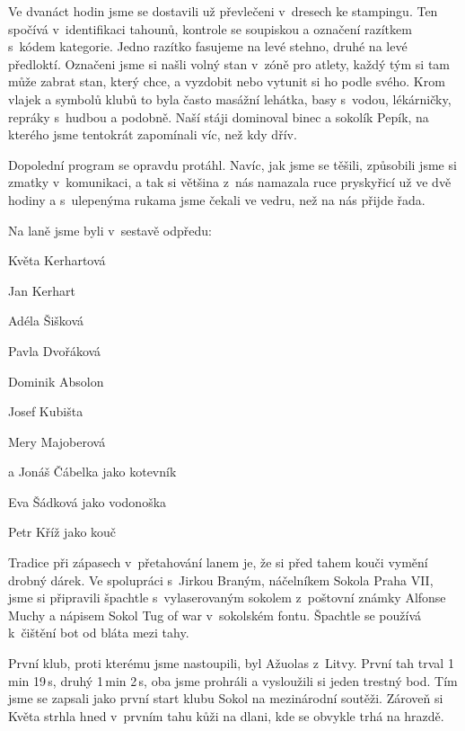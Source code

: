 \documentclass[11pt]{article}
\begin{document}
Ve dvanáct hodin jsme se dostavili už převlečeni v~dresech ke stampingu. Ten spočívá v~identifikaci tahounů, kontrole se soupiskou a označení razítkem s~kódem kategorie. Jedno razítko fasujeme na levé stehno, druhé na levé předloktí. Označeni jsme si našli volný stan v~zóně pro atlety, každý tým si tam může zabrat stan, který chce, a vyzdobit nebo vytunit si ho podle svého. Krom vlajek a symbolů klubů to byla často masážní lehátka, basy s~vodou, lékárničky, repráky s~hudbou a podobně. Naší stáji dominoval binec a sokolík Pepík, na kterého jsme tentokrát zapomínali víc, než kdy dřív.

Dopolední program se opravdu protáhl. Navíc, jak jsme se těšili, způsobili jsme si zmatky v~komunikaci, a tak si většina z~nás namazala ruce pryskyřicí už ve dvě hodiny a s~ulepenýma rukama jsme čekali ve vedru, než na nás přijde řada.

Na laně jsme byli v~sestavě odpředu:

\vspace*{6pt}

Květa Kerhartová

Jan Kerhart

Adéla Šišková

Pavla Dvořáková

Dominik Absolon

Josef Kubišta

Mery Majoberová

a Jonáš Čábelka jako kotevník

\vspace*{6pt}

Eva Šádková jako vodonoška

Petr Kříž jako kouč

\vspace*{6pt}

Tradice při zápasech v~přetahování lanem je, že si před tahem kouči vymění drobný dárek. Ve spolupráci s~Jirkou Braným, náčelníkem Sokola Praha VII, jsme si připravili špachtle s~vylaserovaným sokolem z~poštovní známky Alfonse Muchy a nápisem Sokol Tug of war v~sokolském fontu. Špachtle se používá k~čištění bot od bláta mezi tahy.

První klub, proti kterému jsme nastoupili, byl Ažuolas z~Litvy. První tah trval 1\,min 19\,s, druhý 1\,min 2\,s, oba jsme prohráli a vysloužili si jeden trestný bod. Tím jsme se zapsali jako první start klubu Sokol na mezinárodní soutěži. Zároveň si Květa strhla hned v~prvním tahu kůži na dlani, kde se obvykle trhá na hrazdě.
\end{document}
